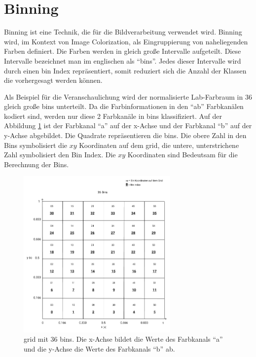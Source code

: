 \section{Binning}\label{section:binning}
Binning ist eine Technik, die für die Bildverarbeitung verwendet wird. Binning wird, im Kontext von Image Colorization, als Eingruppierung 
von naheliegenden Farben definiert. Die Farben werden in gleich große Intervalle aufgeteilt. Diese Intervalle bezeichnet man im englischen als
``\gls{bin}s''. Jedes dieser Intervalle wird durch einen \gls{bin} Index repräsentiert, somit reduziert sich die Anzahl der Klassen die vorhergesagt werden
können.

Als Beispiel für die Veranschaulichung wird der normalisierte Lab-Farbraum in 36 gleich große \gls{bin}s unterteilt. Da die Farbinformationen 
in den ``ab'' Farbkanälen kodiert sind, werden nur diese 2 Farbkanäle in \gls{bin}s klassifiziert. Auf der Abbildung \ref{image:bins} ist der Farbkanal 
``a'' auf der x-Achse und der Farbkanal ``b'' auf der y-Achse abgebildet. Die Quadrate repräsentieren die \gls{bin}s. Die obere Zahl in den Bins 
symbolisiert die $xy$ Koordinaten auf dem \gls{grid}, die untere, unterstrichene Zahl symbolisiert den Bin Index. 
Die $xy$ Koordinaten sind Bedeutsam für die Berechnung der Bins.

\begin{figure}[H]
  \centering
  \includegraphics[width=0.7\textwidth]{resources/bins/bins.jpg}
  \caption{
  \gls{grid} mit 36 bins. Die x-Achse bildet die Werte des Farbkanals ``a'' und die y-Achse die Werte des Farbkanals ``b'' ab.
  }
  \label{image:bins}
\end{figure}

